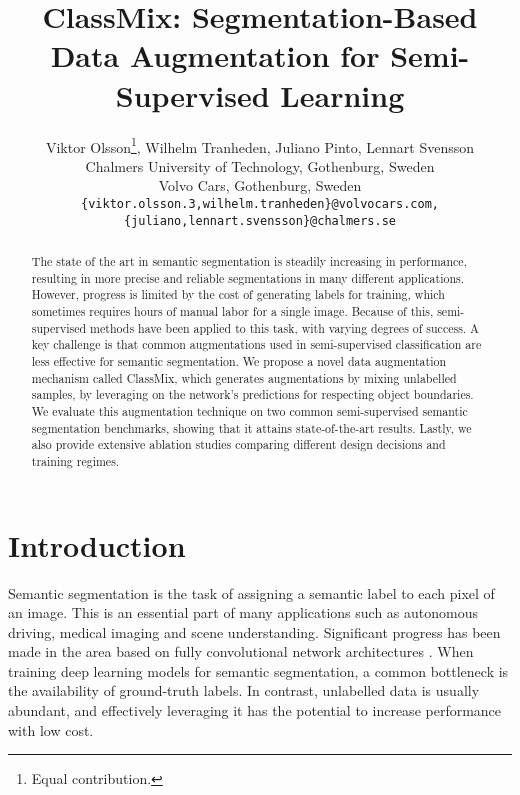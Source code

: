 \documentclass[10pt,twocolumn,letterpaper]{article}
\begin{document}
\title{ClassMix: Segmentation-Based Data Augmentation for Semi-Supervised Learning}

\author{Viktor Olsson\thanks{Equal contribution.},
Wilhelm Tranheden{\footnotemark[\value{footnote}]},
Juliano Pinto,
Lennart Svensson\\
Chalmers University of Technology, Gothenburg, Sweden\\
Volvo Cars, Gothenburg, Sweden\\
{\tt\small \{viktor.olsson.3,wilhelm.tranheden\}@volvocars.com, \{juliano,lennart.svensson\}@chalmers.se}
}

\maketitle


\begin{abstract}
   The state of the art in semantic segmentation is steadily increasing in performance, resulting in more precise and reliable segmentations in many different applications. However, progress is limited by the cost of generating labels for training, which sometimes requires hours of manual labor for a single image. Because of this, semi-supervised methods have been applied to this task, with varying degrees of success. A key challenge is that common augmentations used in semi-supervised classification are less effective for semantic segmentation. We propose a novel data augmentation mechanism called ClassMix, which generates augmentations by mixing unlabelled samples, by leveraging on the network's predictions for respecting object boundaries. We evaluate this augmentation technique on two common semi-supervised semantic segmentation benchmarks, showing that it attains state-of-the-art results. Lastly, we also provide extensive ablation studies comparing different design decisions and training regimes. 
\end{abstract}



\section{Introduction}
Semantic segmentation is the task of assigning a semantic label to each pixel of an image. This is an essential part of many applications such as autonomous driving, medical imaging and scene understanding. Significant progress has been made in the area based on fully convolutional network architectures \cite{long2014fully,DeepLabv1,PSPNet}. When training deep learning models for semantic segmentation, a common bottleneck is the availability of ground-truth labels. In contrast, unlabelled data is usually abundant, and effectively leveraging it has the potential to increase performance with low cost. 
\end{document}
